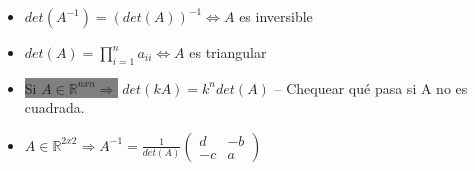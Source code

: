 \begin{enumerate}
\begin{itemize}
        \item $det(A^{-1}) = (det(A))^{-1} \iff A$ es inversible
        \item $det(A) = \prod_{i=1}^{n}a_{ii} \iff A$ es triangular 
        \item \colorbox{Gray}{Si $A \in \mathbb{R}^{nxn} \Rightarrow$} $det(kA) = k^ndet(A)$ -- Chequear qué pasa si A no es cuadrada.
        \item $A \in \mathbb{R}^{2x2} \Rightarrow A^{-1} = \frac{1}{det(A)} \begin{pmatrix}
                        d & -b\\
                        -c & a
                        \end{pmatrix}$
    \end{itemize}
\end{enumerate}

